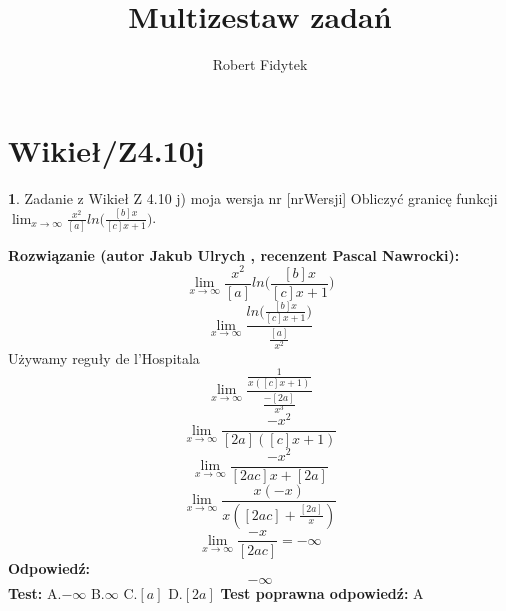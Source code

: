 \documentclass[12pt, a4paper]{article}
\title{Multizestaw zadań}
\author{Robert Fidytek}
\date{}
\theoremstyle{definition} %
\newtheorem{zad}{}
\newcommand{\kategoria}[1]{\section{#1}} %
\newcommand{\zadStart}[1]{\begin{zad}#1\newline} %
\newcommand{\zadStop}{\end{zad}}   %
\newcommand{\rozwStart}[2]{\noindent \textbf{Rozwiązanie (autor #1 , recenzent #2): }\newline} %
\newcommand{\rozwStop}{\newline}                                            %
\newcommand{\odpStart}{\noindent \textbf{Odpowiedź:}\newline}    %
\newcommand{\odpStop}{\newline}                                             %
\newcommand{\testStart}{\noindent \textbf{Test:}\newline} %
\newcommand{\testStop}{\newline} %
\newcommand{\kluczStart}{\noindent \textbf{Test poprawna odpowiedź:}\newline} %
\newcommand{\kluczStop}{\newline} %
\begin{document}
\maketitle


\kategoria{Wikieł/Z4.10j}
\zadStart{Zadanie z Wikieł Z 4.10 j) moja wersja nr [nrWersji]}
Obliczyć granicę funkcji $\lim_{x \to \infty}\frac{x^{2}}{[a]}ln\big(\frac{[b]x}{[c]x+1}\big)$.
\zadStop
\rozwStart{Jakub Ulrych}{Pascal Nawrocki}
$$\lim_{x \to \infty}\frac{x^{2}}{[a]}ln\big(\frac{[b]x}{[c]x+1}\big)$$
$$\lim_{x \to \infty}\frac{ln\big(\frac{[b]x}{[c]x+1}\big)}{\frac{[a]}{x^{2}}}$$
Używamy reguły de l'Hospitala
$$\lim_{x \to \infty}\frac{\frac{1}{x([c]x+1)}}{\frac{-[2a]}{x^{3}}}$$
$$\lim_{x \to \infty}\frac{-x^{2}}{[2a]([c]x+1)}$$
$$\lim_{x \to \infty}\frac{-x^{2}}{[2ac]x+[2a]}$$
$$\lim_{x \to \infty}\frac{x(-x)}{x([2ac]+\frac{[2a]}{x})}$$
$$\lim_{x \to \infty}\frac{-x}{[2ac]}=-\infty$$
\rozwStop
\odpStart
$$-\infty$$
\odpStop
\testStart
A.$-\infty$
B.$\infty$
C.$[a]$
D.$[2a]$
\testStop
\kluczStart
A
\kluczStop
\end{document}
